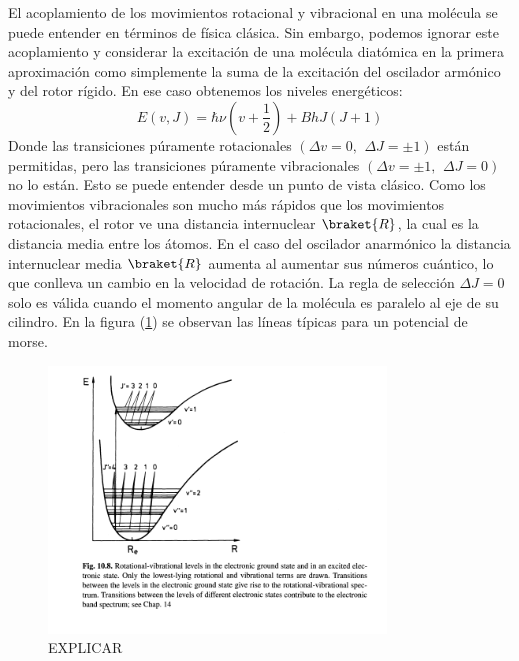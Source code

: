 \documentclass[a4paper]{article}
\begin{document}
El acoplamiento de los movimientos rotacional y vibracional en una molécula se puede entender en términos de física clásica. Sin embargo, podemos ignorar este acoplamiento y considerar la excitación de una molécula diatómica en la primera aproximación como simplemente la suma de la excitación del oscilador armónico y del rotor rígido. En ese caso obtenemos los niveles energéticos:
\begin{equation}
E(v,J)=\hbar\nu(v+\frac{1}{2})+ BhJ(J+1)
\end{equation}
Donde  las transiciones púramente rotacionales $(\Delta v = 0, \,\ \Delta J = \pm 1)$ están permitidas, pero las transiciones púramente vibracionales $(\Delta v = \pm 1, \,\ \Delta J = 0)$ no lo están. Esto se puede entender desde un punto de vista clásico. Como los movimientos vibracionales son mucho más rápidos que los movimientos rotacionales, el rotor ve una distancia internuclear $\braket{R}$, la cual es la distancia media entre los átomos. En el caso del oscilador anarmónico la distancia internuclear media $\braket{R}$ aumenta al aumentar sus números cuántico, lo que conlleva un cambio en la velocidad de rotación. La regla de selección $\Delta J=0$ solo es válida cuando el momento angular de la molécula es paralelo al eje de su cilindro.
En la figura (\ref{transiciones}) se observan las líneas típicas para un potencial de morse.
\begin{figure}
\includegraphics[width=0.8\textwidth]{niv_rot_vib_elect.png}
\caption{EXPLICAR}
\label{transiciones}
\end{figure}
\newpage
\printbibliography
\end{document}
